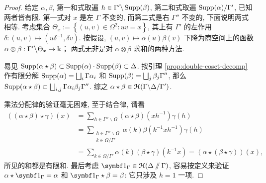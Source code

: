 \begin{proof}
	给定 $\alpha, \beta$, 第一和式取遍 $h \in \Gamma' \backslash \operatorname{Supp}(\beta)$, 第二和式取遍 $\operatorname{Supp}(\alpha)/\Gamma'$, 已知两者皆有限. 第一式对 $x$ 是左 $\Gamma$ 不变的, 而第二式是右 $\Gamma''$ 不变的, 下面说明两式相等. 考虑集合 $\Theta_x := \left\{ (u,v) \in \Omega^2 : uv=x \right\}$, 其上有 $\Gamma'$ 的左作用 $\delta: (u,v) \mapsto (u\delta^{-1}, \delta v)$. 按假设, $(u,v) \mapsto \alpha(u)\beta(v)$ 下降为商空间上的函数 $\alpha \otimes \beta: \Gamma' \big\backslash \Theta_x \to \Bbbk$； 两式无非是对 $\alpha \otimes \beta$ 求和的两种方法.

	易见 $\operatorname{Supp}(\alpha \star \beta) \subset \operatorname{Supp}(\alpha) \cdot \operatorname{Supp}(\beta) \subset \Delta$. 按引理 \ref{prop:double-coset-decomp} 作有限分解 $\operatorname{Supp}(\alpha) = \bigsqcup_i \Gamma \alpha_i$ 和 $\operatorname{Supp}(\beta) = \bigsqcup_j \beta_j \Gamma''$, 那么 $\operatorname{Supp}(\alpha \star \beta) \subset \bigsqcup_{i,j} \Gamma \alpha_i \beta_j \Gamma''$. 综之 $\alpha \star \beta \in \EuScript{H}(\Gamma \backslash \Delta /\Gamma')$.
	
	乘法分配律的验证毫无困难, 至于结合律, 请看
	\begin{align*}
		((\alpha \star \beta) \star \gamma)(x) & = \sum_{h \in \Gamma'' \backslash \Omega} (\alpha \star \beta)(xh^{-1}) \gamma(h) \\
		& = \sum_{\substack{ h \in \Gamma'' \backslash \Omega \\ k \in \Omega/\Gamma'}} \alpha(k) \beta(k^{-1}xh^{-1}) \gamma(h) \\
		& = \sum_{k \in \Omega/\Gamma'} \alpha(k) (\beta \star \gamma)(k^{-1}x) = (\alpha \star (\beta \star \gamma))(x),
	\end{align*}
	所见的和都是有限和. 最后考虑 $\charfcn_\Gamma \in \EuScript{H}(\Delta \sslash \Gamma)$, 容易按定义来验证 $\alpha \star \charfcn_\Gamma = \alpha$ 和 $\charfcn_\Gamma \star \beta = \beta$: 它只涉及 $h = 1$ 一项.
\end{proof}

